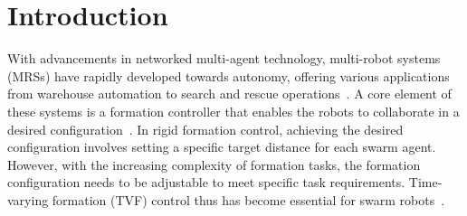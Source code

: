 \section{Introduction}

With advancements in networked multi-agent technology, multi-robot systems (MRSs) have rapidly developed towards autonomy, offering various applications from warehouse automation to search and rescue operations~\cite {6303906,1335496}. A core element of these systems is a formation controller that enables the robots to collaborate in a desired configuration~\cite{1545539,Oh2015}. In rigid formation control, achieving the desired configuration involves setting a specific target distance for each swarm agent. However, with the increasing complexity of formation tasks, the formation configuration needs to be adjustable to meet specific task requirements. Time-varying formation (TVF) control thus has become essential for swarm robots~\cite{Dong2015,Dong2016}.

